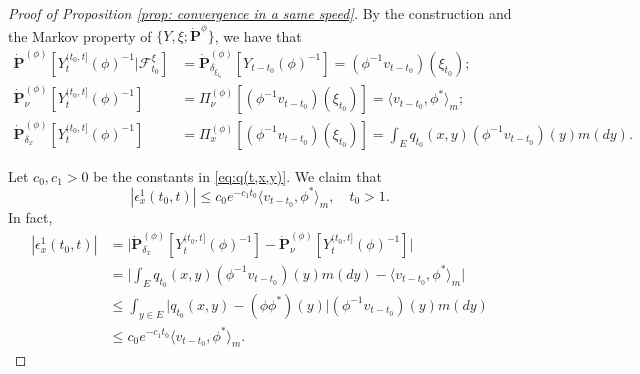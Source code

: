 \documentclass[12pt, a4paper]{amsart}
\theoremstyle{definition}
\numberwithin{equation}{section}
\begin{document}
\begin{proof}[Proof of Proposition \ref{prop: convergence in a same speed}]
	By the construction and the Markov property of $\{Y,\xi; \dot {\mathbf P}^{\phi}\}$, we have that
\begin{equation}\label{eq: some equations for PY-1}\begin{split}
	\dot{\mathbf P}^{(\phi)} [Y_t^{(t_0,t]}(\phi)^{-1}|\mathscr F^\xi_{t_0}]
	&= \dot{\mathbf P}_{\delta_{\xi_{t_0}}}^{(\phi)}  [Y_{t-t_0}(\phi)^{-1}]
	= (\phi^{-1}v_{t-t_0})(\xi_{t_0});
	\\ \dot{\mathbf P}_\nu^{(\phi)}[Y_t^{(t_0,t]}(\phi)^{-1}]
	&= \Pi_{\nu}^{(\phi)}[(\phi^{-1}v_{t-t_0})(\xi_{t_0}) ]
	= \langle v_{t-t_0},\phi^* \rangle_m;
	\\ \dot{\mathbf P}_{\delta_x}^{(\phi)}[Y_t^{(t_0,t]}(\phi)^{-1}]
	&= \Pi_x^{(\phi)}[(\phi^{-1}v_{t-t_0})(\xi_{t_0}) ]
	=  \int_E  q_{t_0}(x,y)(\phi^{-1}v_{t-t_0})(y) m(dy).
\end{split}\end{equation}

	Let  $c_0, c_1>0$ be the constants in \eqref{eq:q(t,x,y)}.
	We claim that
\begin{equation}\label{eq: bound for epsilon1}
	|\epsilon_x^1(t_0,t)|
	\leq c_0 e^{-c_1 t_0}\langle v_{t-t_0},\phi^* \rangle_m,
    \quad t_0 > 1.
\end{equation}
	In fact,
\begin{equation}\label{eq:epsilon-1}\begin{split}
	|\epsilon_x^1(t_0,t)|
	& = \big| \dot {\mathbf P}_{\delta_x}^{(\phi)} [Y^{(t_0,t]}_t(\phi)^{-1}] - \dot {\mathbf P}_\nu^{(\phi)} [Y^{(t_0,t]}_t(\phi)^{-1}] \big| \\
	& = \Big|  \int_E  q_{t_0}(x,y)(\phi^{-1}v_{t-t_0})(y) m(dy) - \langle v_{t-t_0},\phi^* \rangle_m \Big|\\
	& \leq \int_{y\in E} \big| q_{t_0}(x,y) - (\phi\phi^*)(y) \big| (\phi^{-1}v_{t-t_0})(y) m(dy)\\
	& \leq c_0 e^{-c_1 t_0}\langle v_{t-t_0},\phi^* \rangle_m .
\end{split}\end{equation}


\end{proof}
\end{document}
